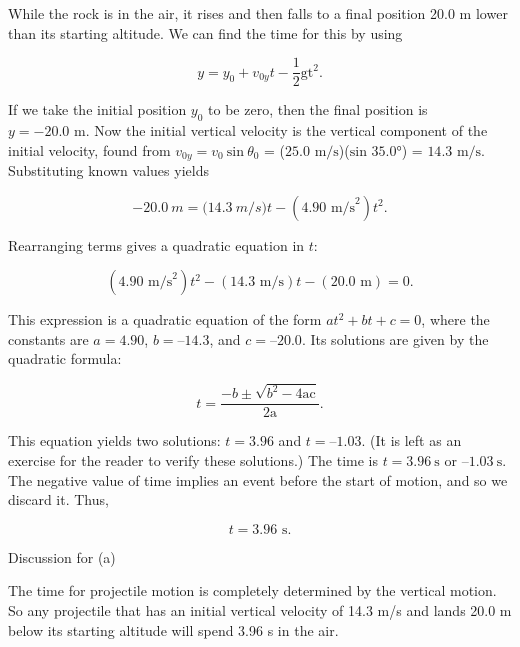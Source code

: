 \documentclass[
]{book}
\newenvironment{tinysection}{}{}
\begin{document}
While the rock is in the air, it rises and then falls to a final
position 20.0 m lower than its starting altitude. We can find the time
for this by using

\leavevmode\hypertarget{eip-895}{}%
\[{{y = {y_{0} + v_{0y}}}{t - \frac{1}{2}}\text{gt}^{2}\text{.}}{}\]

If we take the initial position \(y_{0}{}\) to be zero, then the final
position is \({{y = {- \text{20}}}\text{.0\ \ m}\text{.}}{}\) Now the
initial vertical velocity is the vertical component of the initial
velocity, found from \({{v_{0y} = v_{0}}\ \text{sin}\ \theta_{0}}{}\) =
(\({\text{25}\text{.}\text{0~m/s}}{}\))(\(\text{sin\ 35.0°}{}\)) =
\({\text{14}\text{.}\text{3~m/s}}{}\). Substituting known values yields

\leavevmode\hypertarget{eip-722}{}%
\[{{{- \text{20}}\text{.}0\ m{= (}\text{14}\text{.}3\ m/s){t - \left( {4\text{.}\text{90\ m/s}^{2}} \right)}t^{2}}\text{.}}{}\]

Rearranging terms gives a quadratic equation in \(t{}\):

\leavevmode\hypertarget{eip-931}{}%
\[{\left( {4\text{.}\text{90\ m/s}^{2}} \right){t^{2} - \left( {\text{14}\text{.}\text{3\ m/s}} \right)}{{t - \left( \text{20.0\ m} \right)} = 0.}}{}\]

This expression is a quadratic equation of the form
\({at}^{2} + {bt} + c = 0\), where the constants are \(a = 4.90\),
\(b = –14.3\), and \(c = –20.0.\) Its solutions are given by the quadratic
formula:

\leavevmode\hypertarget{eip-880}{}%
\[{{t = \frac{{- b} \pm \sqrt{{b^{2} - 4}\text{ac}}}{\text{2}\text{a}}}\text{.}}{}\]

This equation yields two solutions: \(t = 3.96\) and \(t = –1.03\). (It is
left as an exercise for the reader to verify these solutions.) The time
is \(t = 3.96\ \text{s}\) or \(–1.03\ \text{s}\). The negative value of time
implies an event before the start of motion, and so we discard it. Thus,

\leavevmode\hypertarget{eip-267}{}%
\[{{t = 3}\text{.}\text{96\ s}\text{.}}{}\]

\begin{tinysection}

{Discussion for (a)}

\end{tinysection}

The time for projectile motion is completely determined by the vertical
motion. So any projectile that has an initial vertical velocity of 14.3
m/s and lands 20.0 m below its starting altitude will spend 3.96 s in
the air.
\end{document}
